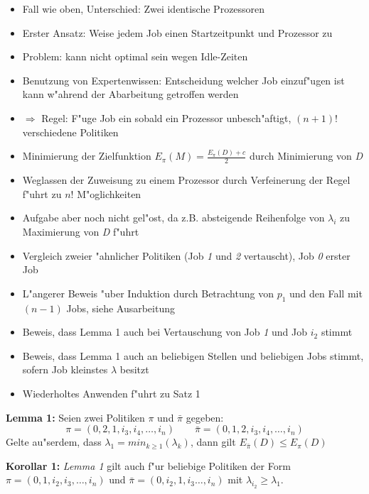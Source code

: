 \documentclass[a4paper]{report}
\begin{document}
\begin{itemize}
\item Fall wie oben, Unterschied: Zwei identische Prozessoren
\item Erster Ansatz: Weise jedem Job einen Startzeitpunkt und Prozessor zu
\item Problem: kann nicht optimal sein wegen Idle-Zeiten
\item Benutzung von Expertenwissen: Entscheidung welcher Job einzuf"ugen ist kann w"ahrend der Abarbeitung getroffen werden
\item \(\Rightarrow\) Regel: F"uge Job ein sobald ein Prozessor unbesch"aftigt, \((n+1)!\) verschiedene Politiken
\item Minimierung der Zielfunktion \(E_{\pi}(M) = \frac{E_{\pi}(D) + c}{2}\) durch Minimierung von \emph{D}
\item Weglassen der Zuweisung zu einem Prozessor durch Verfeinerung der Regel f"uhrt zu \(n!\) M"oglichkeiten
\item Aufgabe aber noch nicht gel"ost, da z.B. absteigende Reihenfolge von \(\lambda_{i}\) zu Maximierung von \emph{D} f"uhrt
\item Vergleich zweier "ahnlicher Politiken (Job \emph{1} und \emph{2} vertauscht), Job \emph{0} erster Job
\item L"angerer Beweis "uber Induktion durch Betrachtung von \(p_{1}\) und den Fall mit \((n-1)\) Jobs, siehe Ausarbeitung
\item Beweis, dass Lemma 1 auch bei Vertauschung von Job \emph{1} und Job \(i_{2}\) stimmt
\item Beweis, dass Lemma 1 auch an beliebigen Stellen und beliebigen Jobs stimmt, sofern Job kleinstes \(\lambda\) besitzt
\item Wiederholtes Anwenden f"uhrt zu Satz 1
\end{itemize}


\textbf{Lemma 1:} Seien zwei Politiken \(\pi\) und \(\bar \pi\) gegeben:
\begin{displaymath}\pi = (0,2,1, i_{3}, i_{4},\ldots,i_{n}) \qquad \bar \pi = (0, 1,2,i_{3}, i_{4},\ldots,i_{n})\end{displaymath} 
Gelte au"serdem, dass \(\lambda_{1} = min_{k \ge 1}(\lambda_{k})\), dann gilt \(E_{\bar \pi}(D)\le E_{\pi}(D)\)


\textbf{Korollar 1:} \emph{Lemma 1} gilt auch f"ur beliebige Politiken der Form \(\pi = (0, 1, i_{2}, i_{3}, \ldots, i_{n})\) und \(\bar \pi = (0, i_{2}, 1, i_{3} \ldots, i_{n})\) mit \(\lambda_{i_{2}} \ge \lambda_{1}\).
\end{document}
